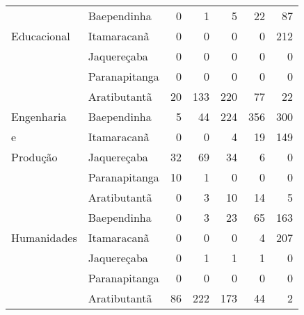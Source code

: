 \begin{table}[h]
\begin{tabular}{ll rrrrr}
                          & Baependinha             &                  0 &            1 &           5 &         22 &               87 \\ 
  Educacional             & Itamaracanã             &                  0 &            0 &           0 &          0 &              212 \\ 
                          & Jaquereçaba             &                  0 &            0 &           0 &          0 &                0 \\ 
                          & Paranapitanga           &                  0 &            0 &           0 &          0 &                0 \\ 
\midrule
					& Aratibutantã            &                 20 &          133 &         220 &         77 &               22 \\ 
	Engenharia          & Baependinha             &                  5 &           44 &         224 &        356 &              300 \\ 
    e                	& Itamaracanã             &                  0 &            0 &           4 &         19 &              149 \\ 
    Produção            & Jaquereçaba             &                 32 &           69 &          34 &          6 &                0 \\ 
                        & Paranapitanga           &                 10 &            1 &           0 &          0 &                0 \\ 
\midrule
                    & Aratibutantã            &                  0 &            3 &          10 &         14 &                5 \\ 
                          & Baependinha             &                  0 &            3 &          23 &         65 &              163 \\ 
	Humanidades           & Itamaracanã             &                  0 &            0 &           0 &          4 &              207 \\ 
                          & Jaquereçaba             &                  0 &            1 &           1 &          1 &                0 \\ 
                          & Paranapitanga           &                  0 &            0 &           0 &          0 &                0 \\ 
\midrule
					& Aratibutantã            &                 86 &          222 &         173 &         44 &                2 \\ 

\end{tabular}
\end{table}
